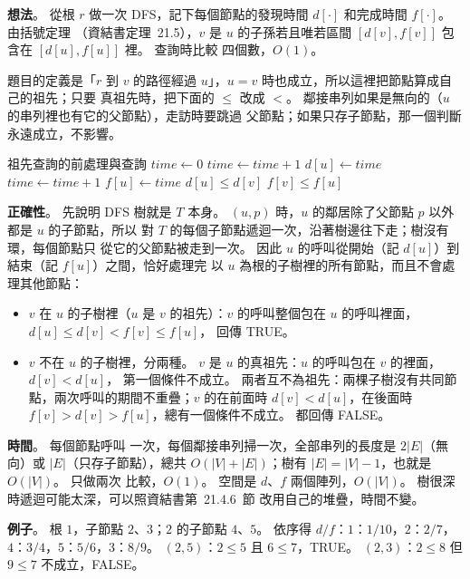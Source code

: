 \begin{pastsoln}
\textbf{想法}。 從根 $r$ 做一次 DFS，記下每個節點的發現時間 $d[\cdot]$ 和完成時間 $f[\cdot]$。 由括號定理
（資結書定理~21.5），$v$ 是 $u$ 的子孫若且唯若區間 $[d[v], f[v]]$ 包含在 $[d[u], f[u]]$ 裡。 查詢時比較
四個數，$O(1)$。

題目的定義是「$r$ 到 $v$ 的路徑經過 $u$」，$u = v$ 時也成立，所以這裡把節點算成自己的祖先；只要
真祖先時，把下面的 $\le$ 改成 $<$。 鄰接串列如果是無向的（$u$ 的串列裡也有它的父節點），走訪時要跳過
父節點；如果只存子節點，那一個判斷永遠成立，不影響。

\begin{pseudo}{祖先查詢的前處理與查詢}
    \State $\mathit{time} \gets 0$
    \State {}
\EndProcedure
\Statex
{} 
    \State $\mathit{time} \gets \mathit{time} + 1$
    \State $d[u] \gets \mathit{time}$
            \State {}
        \EndIf
    \EndFor
    \State $\mathit{time} \gets \mathit{time} + 1$
    \State $f[u] \gets \mathit{time}$
\EndProcedure
\Statex
{}
    \State \Return $d[u] \le d[v]$ \AND $f[v] \le f[u]$
\EndFunction
\end{pseudo}

\textbf{正確性}。 先說明 DFS 樹就是 $T$ 本身。 $(u, p)$ 時，$u$ 的鄰居除了父節點 $p$ 以外都是
$u$ 的子節點，所以  對 $T$ 的每個子節點遞迴一次，沿著樹邊往下走；樹沒有環，每個節點只
從它的父節點被走到一次。 因此 $u$ 的呼叫從開始（記 $d[u]$）到結束（記 $f[u]$）之間，恰好處理完
以 $u$ 為根的子樹裡的所有節點，而且不會處理其他節點：
\begin{itemize}
\item $v$ 在 $u$ 的子樹裡（$u$ 是 $v$ 的祖先）：$v$ 的呼叫整個包在 $u$ 的呼叫裡面，
$d[u] \le d[v] < f[v] \le f[u]$， 回傳 TRUE。
\item $v$ 不在 $u$ 的子樹裡，分兩種。 $v$ 是 $u$ 的真祖先：$u$ 的呼叫包在 $v$ 的裡面，$d[v] < d[u]$，
第一個條件不成立。 兩者互不為祖先：兩棵子樹沒有共同節點，兩次呼叫的期間不重疊；$v$ 的在前面時
$d[v] < d[u]$，在後面時 $f[v] > d[v] > f[u]$，總有一個條件不成立。 都回傳 FALSE。
\end{itemize}

\textbf{時間}。 每個節點呼叫  一次，每個鄰接串列掃一次，全部串列的長度是 $2|E|$（無向）或
$|E|$（只存子節點），總共 $O(|V| + |E|)$；樹有 $|E| = |V| - 1$，也就是 $O(|V|)$。  只做兩次
比較，$O(1)$。 空間是 $d$、$f$ 兩個陣列，$O(|V|)$。 樹很深時遞迴可能太深，可以照資結書第~21.4.6~節
改用自己的堆疊，時間不變。

\textbf{例子}。 根 $1$，子節點 $2$、$3$；$2$ 的子節點 $4$、$5$。 依序得 $d/f$：$1$：$1/10$，$2$：$2/7$，
$4$：$3/4$，$5$：$5/6$，$3$：$8/9$。 $(2, 5)$：$2 \le 5$ 且 $6 \le 7$，TRUE。
$(2, 3)$：$2 \le 8$ 但 $9 \le 7$ 不成立，FALSE。
\end{pastsoln}
